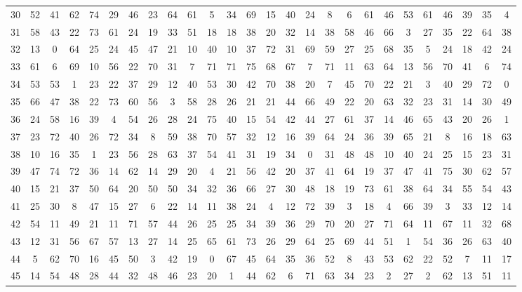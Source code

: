 \begin{table}
\begin{tabular}{c c c c c c c c c c c c c c c c c c c c c c c c c c }
30 & 52 & 41 & 62 & 74 & 29 & 46 & 23 & 64 & 61 & 5 & 34 & 69 & 15 & 40 & 24 & 8 & 6 & 61 & 46 & 53 & 61 & 46 & 39 & 35 & 4 \\
31 & 58 & 43 & 22 & 73 & 61 & 24 & 19 & 33 & 51 & 18 & 18 & 38 & 20 & 32 & 14 & 38 & 58 & 46 & 66 & 3 & 27 & 35 & 22 & 64 & 38 \\
32 & 13 & 0 & 64 & 25 & 24 & 45 & 47 & 21 & 10 & 40 & 10 & 37 & 72 & 31 & 69 & 59 & 27 & 25 & 68 & 35 & 5 & 24 & 18 & 42 & 24 \\
33 & 61 & 6 & 69 & 10 & 56 & 22 & 70 & 31 & 7 & 71 & 71 & 75 & 68 & 67 & 7 & 71 & 11 & 63 & 64 & 13 & 56 & 70 & 41 & 6 & 74 \\
34 & 53 & 53 & 1 & 23 & 22 & 37 & 29 & 12 & 40 & 53 & 30 & 42 & 70 & 38 & 20 & 7 & 45 & 70 & 22 & 21 & 3 & 40 & 29 & 72 & 0 \\
35 & 66 & 47 & 38 & 22 & 73 & 60 & 56 & 3 & 58 & 28 & 26 & 21 & 21 & 44 & 66 & 49 & 22 & 20 & 63 & 32 & 23 & 31 & 14 & 30 & 49 \\
36 & 24 & 58 & 16 & 39 & 4 & 54 & 26 & 28 & 24 & 75 & 40 & 15 & 54 & 42 & 44 & 27 & 61 & 37 & 14 & 46 & 65 & 43 & 20 & 26 & 1 \\
37 & 23 & 72 & 40 & 26 & 72 & 34 & 8 & 59 & 38 & 70 & 57 & 32 & 12 & 16 & 39 & 64 & 24 & 36 & 39 & 65 & 21 & 8 & 16 & 18 & 63 \\
38 & 10 & 16 & 35 & 1 & 23 & 56 & 28 & 63 & 37 & 54 & 41 & 31 & 19 & 34 & 0 & 31 & 48 & 48 & 10 & 40 & 24 & 25 & 15 & 23 & 31 \\
39 & 47 & 74 & 72 & 36 & 14 & 62 & 14 & 29 & 20 & 4 & 21 & 56 & 42 & 20 & 37 & 41 & 64 & 19 & 37 & 47 & 41 & 75 & 30 & 62 & 57 \\
40 & 15 & 21 & 37 & 50 & 64 & 20 & 50 & 50 & 34 & 32 & 36 & 66 & 27 & 30 & 48 & 18 & 19 & 73 & 61 & 38 & 64 & 34 & 55 & 54 & 43 \\
41 & 25 & 30 & 8 & 47 & 15 & 27 & 6 & 22 & 14 & 11 & 38 & 24 & 4 & 12 & 72 & 39 & 3 & 18 & 4 & 66 & 39 & 3 & 33 & 12 & 14 \\
42 & 54 & 11 & 49 & 21 & 11 & 71 & 57 & 44 & 26 & 25 & 25 & 34 & 39 & 36 & 29 & 70 & 20 & 27 & 71 & 64 & 11 & 67 & 11 & 32 & 68 \\
43 & 12 & 31 & 56 & 67 & 57 & 13 & 27 & 14 & 25 & 65 & 61 & 73 & 26 & 29 & 64 & 25 & 69 & 44 & 51 & 1 & 54 & 36 & 26 & 63 & 40 \\
44 & 5 & 62 & 70 & 16 & 45 & 50 & 3 & 42 & 19 & 0 & 67 & 45 & 64 & 35 & 36 & 52 & 8 & 43 & 53 & 62 & 22 & 52 & 7 & 11 & 17 \\
45 & 14 & 54 & 48 & 28 & 44 & 32 & 48 & 46 & 23 & 20 & 1 & 44 & 62 & 6 & 71 & 63 & 34 & 23 & 2 & 27 & 2 & 62 & 13 & 51 & 11 \\

\end{tabular}
\end{table}
